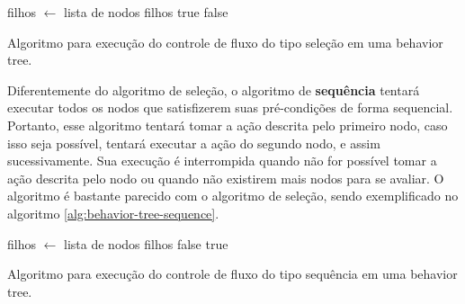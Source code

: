 \begin{algorithm}[H]
\begin{center}
	\begin{algorithmic}[1]
        \STATE filhos $\gets$ lista de nodos filhos
                \RETURN true
            \ENDIF
        \ENDFOR
        \RETURN false
    \end{algorithmic}
\end{center}
\caption[Algoritmo para execução do controle de fluxo do tipo seleção em
uma behavior tree.]
{\label{alg:behavior-tree-selection} Algoritmo para execução do controle
de fluxo do tipo seleção em uma behavior tree.}
\end{algorithm}

Diferentemente do algoritmo de seleção, o algoritmo de \textbf{sequência}
tentará executar todos os nodos que satisfizerem suas pré-condições de forma
sequencial. Portanto, esse algoritmo tentará tomar a ação descrita pelo
primeiro nodo, caso isso seja possível, tentará executar a ação do segundo
nodo, e assim sucessivamente. Sua execução é interrompida quando não for
possível tomar a ação descrita pelo nodo ou quando não existirem mais
nodos para se avaliar. O algoritmo é bastante parecido com o algoritmo de
seleção, sendo exemplificado no algoritmo \ref{alg:behavior-tree-sequence}.

\begin{algorithm}[H]
\begin{center}
	\begin{algorithmic}[1]
        \STATE filhos $\gets$ lista de nodos filhos
                \RETURN false
            \ENDIF
        \ENDFOR
        \RETURN true
    \end{algorithmic}
\end{center}
\caption[Algoritmo para execução do controle de fluxo do tipo sequência em
uma behavior tree.]
{\label{alg:behavior-tree-sequence} Algoritmo para execução do controle
de fluxo do tipo sequência em uma behavior tree.}
\end{algorithm}

